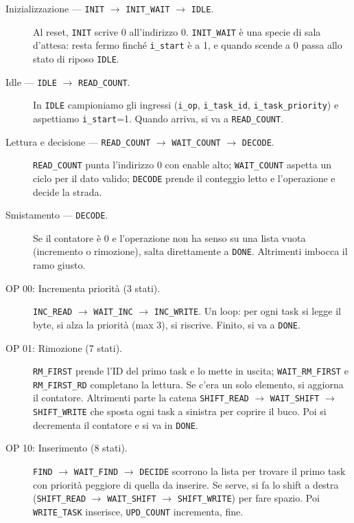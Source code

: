 \documentclass[a4paper,12pt]{article}
\begin{document}
\begin{description}
    \item[Inizializzazione --- \texttt{INIT} $\rightarrow$ \texttt{INIT\_WAIT} $\rightarrow$ \texttt{IDLE}.]
          Al reset, \texttt{INIT} scrive 0 all'indirizzo 0. \texttt{INIT\_WAIT} è una specie di sala d'attesa: resta fermo finché \texttt{i\_start} è a 1, e quando scende a 0 passa allo stato di riposo \texttt{IDLE}.

    \item[Idle --- \texttt{IDLE} $\rightarrow$ \texttt{READ\_COUNT}.]
          In \texttt{IDLE} campioniamo gli ingressi (\texttt{i\_op}, \texttt{i\_task\_id}, \texttt{i\_task\_priority}) e aspettiamo \texttt{i\_start}=1. Quando arriva, si va a \texttt{READ\_COUNT}.

    \item[Lettura e decisione --- \texttt{READ\_COUNT} $\rightarrow$ \texttt{WAIT\_COUNT} $\rightarrow$ \texttt{DECODE}.]
          \texttt{READ\_COUNT} punta l'indirizzo 0 con enable alto; \texttt{WAIT\_COUNT} aspetta un ciclo per il dato valido; \texttt{DECODE} prende il conteggio letto e l'operazione e decide la strada.

    \item[Smistamento --- \texttt{DECODE}.] 
          Se il contatore è 0 e l'operazione non ha senso su una lista vuota (incremento o rimozione), salta direttamente a \texttt{DONE}. Altrimenti imbocca il ramo giusto.

    \item[OP 00: Incrementa priorità (3 stati).]
          \texttt{INC\_READ} $\rightarrow$ \texttt{WAIT\_INC} $\rightarrow$ \texttt{INC\_WRITE}. Un loop: per ogni task si legge il byte, si alza la priorità (max 3), si riscrive. Finito, si va a \texttt{DONE}.
          
    \item[OP 01: Rimozione (7 stati).]
          \texttt{RM\_FIRST} prende l'ID del primo task e lo mette in uscita; \texttt{WAIT\_RM\_FIRST} e \texttt{RM\_FIRST\_RD} completano la lettura. Se c'era un solo elemento, si aggiorna il contatore. Altrimenti parte la catena \texttt{SHIFT\_READ} $\rightarrow$ \texttt{WAIT\_SHIFT} $\rightarrow$ \texttt{SHIFT\_WRITE} che sposta ogni task a sinistra per coprire il buco. Poi si decrementa il contatore e si va in \texttt{DONE}.

    \item[OP 10: Inserimento (8 stati).]
          \texttt{FIND} $\rightarrow$ \texttt{WAIT\_FIND} $\rightarrow$ \texttt{DECIDE} scorrono la lista per trovare il primo task con priorità peggiore di quella da inserire. Se serve, si fa lo shift a destra (\texttt{SHIFT\_READ} $\rightarrow$ \texttt{WAIT\_SHIFT} $\rightarrow$ \texttt{SHIFT\_WRITE}) per fare spazio. Poi \texttt{WRITE\_TASK} inserisce, \texttt{UPD\_COUNT} incrementa, fine.


\end{description}
\end{document}

